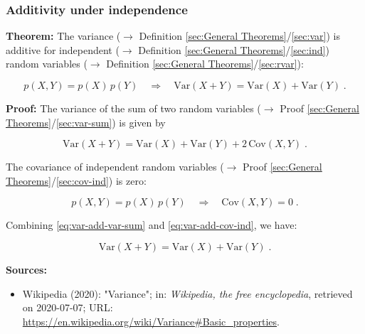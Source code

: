 \documentclass[a4paper,12pt,twoside]{book}
\begin{document}
\subsubsection[\textbf{Additivity under independence}]{Additivity under independence} \label{sec:var-add}
\setcounter{equation}{0}

\textbf{Theorem:} The variance ($\rightarrow$ Definition \ref{sec:General Theorems}/\ref{sec:var}) is additive for independent ($\rightarrow$ Definition \ref{sec:General Theorems}/\ref{sec:ind}) random variables ($\rightarrow$ Definition \ref{sec:General Theorems}/\ref{sec:rvar}):

\begin{equation} \label{eq:var-add-var-add}
p(X,Y) = p(X) \, p(Y) \quad \Rightarrow \quad \mathrm{Var}(X+Y) = \mathrm{Var}(X) + \mathrm{Var}(Y) \; .
\end{equation}


\vspace{1em}
\textbf{Proof:} The variance of the sum of two random variables ($\rightarrow$ Proof \ref{sec:General Theorems}/\ref{sec:var-sum}) is given by

\begin{equation} \label{eq:var-add-var-sum}
\mathrm{Var}(X+Y) = \mathrm{Var}(X) + \mathrm{Var}(Y) + 2 \, \mathrm{Cov}(X,Y) \; .
\end{equation}

The covariance of independent random variables ($\rightarrow$ Proof \ref{sec:General Theorems}/\ref{sec:cov-ind}) is zero:

\begin{equation} \label{eq:var-add-cov-ind}
p(X,Y) = p(X) \, p(Y) \quad \Rightarrow \quad \mathrm{Cov}(X,Y) = 0 \; .
\end{equation}

Combining \eqref{eq:var-add-var-sum} and \eqref{eq:var-add-cov-ind}, we have:

\begin{equation} \label{eq:var-add-var-add-qed}
\mathrm{Var}(X+Y) = \mathrm{Var}(X) + \mathrm{Var}(Y) \; .
\end{equation}


\vspace{1em}
\textbf{Sources:}
\begin{itemize}
\item Wikipedia (2020): "Variance"; in: \textit{Wikipedia, the free encyclopedia}, retrieved on 2020-07-07; URL: \url{https://en.wikipedia.org/wiki/Variance#Basic_properties}.
\end{itemize}
\end{document}
